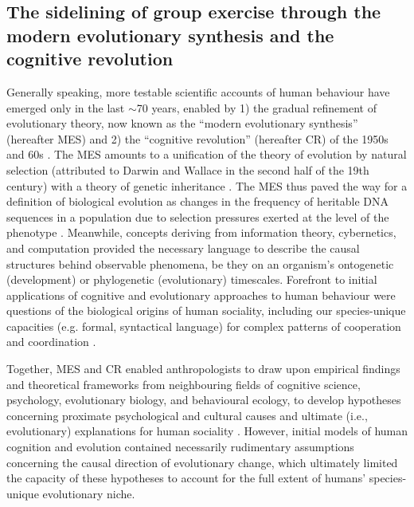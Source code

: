 \begin{CJK}{UTF8}{gbsn}
\subsection{The sidelining of group exercise through the modern evolutionary synthesis and the cognitive revolution \label{sect:visceralSideline}}

Generally speaking, more testable scientific accounts of human behaviour have emerged only in the last $\sim$70 years,  enabled by 1) the gradual refinement of evolutionary theory, now known as the ``modern evolutionary synthesis'' (hereafter MES) and 2) the ``cognitive revolution'' (hereafter CR) of the 1950s and 60s \citep{Laland2010}.  The MES amounts to a unification of the theory of evolution by natural selection (attributed to Darwin and Wallace in the second half of the 19th century) with a theory of genetic inheritance \citep[replacing a previously popular theory of blended inheritance, see][]{Calcott2013}.  The MES thus paved the way for a definition of biological evolution as changes in the frequency of heritable DNA sequences in a population due to selection pressures exerted at the level of the phenotype \citep{Grafen1984}.  Meanwhile, concepts deriving from information theory, cybernetics, and computation provided the necessary language to describe the causal structures behind observable phenomena, be they on an organism's ontogenetic (development) or phylogenetic (evolutionary) timescales.  Forefront to initial applications of cognitive and evolutionary approaches to human behaviour were questions of the biological origins of human sociality, including our species-unique capacities (e.g. formal, syntactical language) for complex patterns of cooperation and coordination \citep{Wilson1975,Chomsky1965}.

Together, MES and CR enabled anthropologists to draw upon empirical findings and theoretical frameworks from neighbouring fields of cognitive science, psychology, evolutionary biology, and behavioural ecology, to develop hypotheses concerning proximate psychological and cultural causes and ultimate (i.e., evolutionary) explanations for human sociality \cite[e.g.][see Appendix~\ref{sect:modernSynthesis} for a more detailed explanation of MS, CR, and their applications to human behaviour)]{Dawkins1976,Wilson1978,Sperber1996,Whitehouse2004,Dunbar1996}.  However, initial models of human cognition and evolution contained necessarily rudimentary assumptions concerning the causal direction of evolutionary change, which ultimately limited the capacity of these hypotheses to account for the full extent of humans' species-unique evolutionary niche.


\end{CJK}
